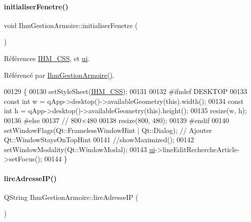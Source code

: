 \paragraph{\texorpdfstring{initialiser\+Fenetre()}{initialiserFenetre()}}
{\footnotesize\ttfamily void Ihm\+Gestion\+Armoire\+::initialiser\+Fenetre (\begin{DoxyParamCaption}{ }\end{DoxyParamCaption})\hspace{0.3cm}{\ttfamily [private]}}



Références \hyperlink{e-stock_8h_a7185157bd11830373a0f95d0dc88b2c3}{I\+H\+M\+\_\+\+C\+SS}, et \hyperlink{class_ihm_gestion_armoire_a793a2816dc21b3161566138d2af5a8b9}{ui}.



Référencé par \hyperlink{class_ihm_gestion_armoire_a7aa5e1514dd5d1b5648a2f6dd36970f9}{Ihm\+Gestion\+Armoire()}.


\begin{DoxyCode}
00129 \{
00130     setStyleSheet(\hyperlink{e-stock_8h_a7185157bd11830373a0f95d0dc88b2c3}{IHM\_CSS});
00131 
00132 \textcolor{preprocessor}{    #ifndef DESKTOP}
00133     \textcolor{keyword}{const} \textcolor{keywordtype}{int} w = qApp->desktop()->availableGeometry(\textcolor{keyword}{this}).width();
00134     \textcolor{keyword}{const} \textcolor{keywordtype}{int} h = qApp->desktop()->availableGeometry(\textcolor{keyword}{this}).height();
00135     resize(w, h);
00136 \textcolor{preprocessor}{    #else}
00137     \textcolor{comment}{// 800×480}
00138     resize(800, 480);
00139 \textcolor{preprocessor}{    #endif}
00140     setWindowFlags(Qt::FramelessWindowHint | Qt::Dialog); \textcolor{comment}{// Ajouter Qt::WindowStaysOnTopHint}
00141     \textcolor{comment}{//showMaximized();}
00142     setWindowModality(Qt::WindowModal);
00143     \hyperlink{class_ihm_gestion_armoire_a793a2816dc21b3161566138d2af5a8b9}{ui}->lineEditRechercheArticle->setFocus();
00144 \}
\end{DoxyCode}
\mbox{\label{class_ihm_gestion_armoire_a68b7ba5bc7f7475b35162b13d3b3db13}} 
\paragraph{\texorpdfstring{lire\+Adresse\+I\+P()}{lireAdresseIP()}}
{\footnotesize\ttfamily Q\+String Ihm\+Gestion\+Armoire\+::lire\+Adresse\+IP (\begin{DoxyParamCaption}{ }\end{DoxyParamCaption})\hspace{0.3cm}{\ttfamily [private]}}



